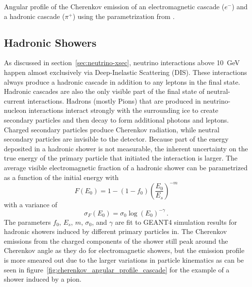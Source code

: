\begin{marginfigure}
    \centering
    
    \caption{Angular profile of the Cherenkov emission of an electromagnetic cascade ($e^-$) and a hadronic cascade ($\pi^+$) using the parametrization from \cite{RADEL2013102}.}
    \label{fig:cherenkov_angular_profile_cascade}
\end{marginfigure}

\subsection{Hadronic Showers}
\label{sec:had-showers}
As discussed in section~\ref{sec:neutrino-xsec}, neutrino interactions above 10~GeV happen almost exclusively via Deep-Inelastic Scattering (DIS).
These interactions always produce a hadronic cascade in addition to any leptons in the final state.
Hadronic cascades are also the only visible part of the final state of neutral-current interactions.
Hadrons (mostly Pions) that are produced in neutrino-nucleon interactions interact strongly with the surrounding ice to create secondary particles and then decay to form additional photons and leptons.
Charged secondary particles produce Cherenkov radiation, while neutral secondary particles are invisible to the detector.
Because part of the energy deposited in a hadronic shower is not measurable, the inherent uncertainty on the true energy of the primary particle that initiated the interaction is larger.
The average visible electromagnetic fraction of a hadronic shower can be parametrized\cite{RADEL2013102} as a function of the initial energy with
\begin{equation}
    F(E_0) = 1 - (1-f_0)\left(\frac{E_0}{E_s}\right)^{-m}
\end{equation}
with a variance of
\begin{equation}
    \sigma_F(E_0) = \sigma_0 \log(E_0)^{-\gamma}\,.
\end{equation}
The parameters $f_0$, $E_s$, $m$, $\sigma_0$, and $\gamma$ are fit to GEANT4 simulation results for hadronic showers induced by different primary particles in\cite{RADEL2013102}.
The Cherenkov emissions from the charged components of the shower still peak around the Cherenkov angle as they do for electromagnetic showers, but the emission profile is more smeared out due to the larger variations in particle kinematics as can be seen in figure~\ref{fig:cherenkov_angular_profile_cascade} for the example of a shower induced by a pion.
